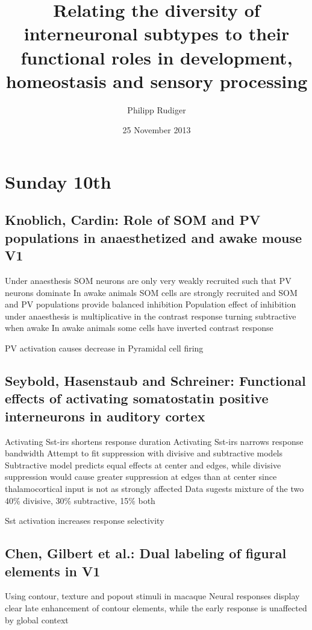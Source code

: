 \documentclass[11pt]{Science}
\title{	Relating the diversity of interneuronal subtypes to their functional roles in development, homeostasis and sensory processing}
\author{Philipp Rudiger}
\date{25 November 2013}
\begin{document}
\maketitle

\setcounter{tocdepth}{3}
\tableofcontents
\vspace*{1cm}
\section{Sunday 10th}
\label{sec-1}


\subsection{Knoblich, Cardin: Role of SOM and PV populations in anaesthetized and awake mouse V1}
\label{sec-1.1}


Under anaesthesis SOM neurons are only very weakly recruited such that PV neurons dominate
In awake animals SOM cells are strongly recruited and SOM and PV populations provide balanced inhibition
Population effect of inhibition under anaesthesis is multiplicative in the contrast response turning subtractive when awake
In awake animals some cells have inverted contrast response

PV activation causes decrease in Pyramidal cell firing

\subsection{Seybold, Hasenstaub and Schreiner: Functional effects of activating somatostatin positive interneurons in auditory cortex}
\label{sec-1.2}


Activating Sst-irs shortens response duration
Activating Sst-irs narrows response bandwidth
Attempt to fit suppression with divisive and subtractive models
Subtractive model predicts equal effects at center and edges, while divisive suppression would cause greater suppression at edges than at center since thalamocortical input is not as strongly affected
Data sugests mixture of the two
40\% divisive, 30\% subtractive, 15\% both

Sst activation increases response selectivity

\subsection{Chen, Gilbert et al.: Dual labeling of figural elements in V1}
\label{sec-1.3}


Using contour, texture and popout stimuli in macaque
Neural responses display clear late enhancement of contour elements, while the early response is unaffected by global context
\end{document}
